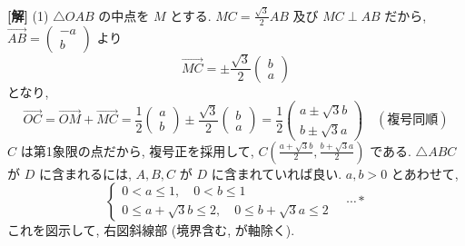 \documentclass[../main.tex]{subfiles}
\begin{document}
\noindent
\textbf{[解]}
(1) $\triangle OAB$ の中点を $M$ とする. $MC = \frac{\sqrt{3}}{2} AB$ 及び $MC \perp AB$ だから, $\vec{AB} =
\begin{pmatrix} -a \\ b
\end{pmatrix}$ より
\[
  \vec{MC} = \pm \frac{\sqrt{3}}{2}
  \begin{pmatrix} b \\ a
  \end{pmatrix}
\]
となり,
\[
  \vec{OC} = \vec{OM} + \vec{MC} = \frac{1}{2}
  \begin{pmatrix} a \\ b
  \end{pmatrix} \pm \frac{\sqrt{3}}{2}
  \begin{pmatrix} b \\ a
  \end{pmatrix} = \frac{1}{2}
  \begin{pmatrix} a \pm \sqrt{3}b \\ b \pm \sqrt{3}a
  \end{pmatrix} \quad (\text{複号同順})
\]
$C$ は第1象限の点だから, 複号正を採用して, $C\left(\frac{a + \sqrt{3}b}{2}, \frac{b + \sqrt{3}a}{2}\right)$ である. $\triangle ABC$ が $D$ に含まれるには, $A, B, C$ が $D$ に含まれていれば良い. $a, b > 0$ とあわせて,
\[
  \begin{cases}
    0 < a \le 1, \quad 0 < b \le 1 \\
    0 \le a + \sqrt{3}b \le 2, \quad 0 \le b + \sqrt{3}a \le 2
  \end{cases} \quad \cdots *
\]
これを図示して, 右図斜線部 (境界含む, が軸除く).
\end{document}
